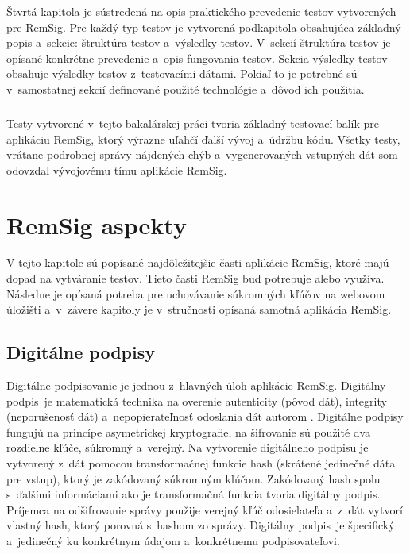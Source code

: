 \documentclass[
  printed, %
  table,   %
oneside,
  nolof,     %
  nolot,     %
]{fithesis3}
\begin{document}
Štvrtá kapitola je sústredená na opis praktického prevedenie testov vytvorených pre RemSig. Pre každý typ testov je vytvorená podkapitola obsahujúca základný popis a~sekcie: štruktúra testov a~výsledky testov. V~sekcií štruktúra testov je opísané konkrétne prevedenie a~opis fungovania testov. Sekcia výsledky testov obsahuje výsledky testov z~testovacími dátami. Pokiaľ to je potrebné sú v~samostatnej sekcií definované použité technológie a~dôvod ich použitia. \paragraph{}
Testy vytvorené v~tejto bakalárskej práci tvoria základný testovací balík pre aplikáciu RemSig, ktorý výrazne uľahčí ďalší vývoj a~údržbu kódu. Všetky testy, vrátane podrobnej správy nájdených chýb a~vygenerovaných vstupných dát som odovzdal vývojovému tímu aplikácie RemSig.
\chapter{RemSig aspekty}
V tejto kapitole sú popísané najdôležitejšie časti aplikácie RemSig, ktoré majú dopad na vytváranie testov. Tieto časti RemSig buď potrebuje alebo využíva. Následne je opísaná potreba pre uchovávanie súkromných kľúčov na webovom úložišti a~v~závere kapitoly je v~stručnosti opísaná samotná aplikácia RemSig.
\section{Digitálne podpisy}
Digitálne podpisovanie je jednou z~hlavných úloh aplikácie RemSig. Digitálny podpis~je matematická technika na overenie autenticity (pôvod dát), integrity (neporušenosť dát) a~nepopierateľnosť odoslania dát autorom \cite{digitalSignature}.  Digitálne podpisy fungujú na princípe asymetrickej kryptografie, na šifrovanie sú použité dva rozdielne kľúče, súkromný a~verejný.
Na vytvorenie digitálneho podpisu je vytvorený z~dát pomocou transformačnej funkcie  hash (skrátené jedinečné dáta pre vstup), ktorý je zakódovaný súkromným kľúčom. Zakódovaný hash spolu s~ďalšími informáciami ako je transformačná funkcia tvoria digitálny podpis. Príjemca na odšifrovanie správy použije verejný kľúč odosielateľa a~z~dát vytvorí vlastný hash, ktorý porovná s~hashom zo správy. Digitálny podpis~je špecifický a~jedinečný ku konkrétnym údajom a~konkrétnemu podpisovateľovi.
\end{document}
